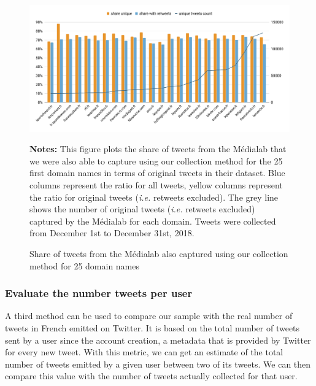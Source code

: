 \begin{figure}
\begin{center}
\includegraphics[width=1\textwidth]{figures/ShareInCommonWithMedialab.pdf}
\end{center}
\scriptsize \textbf{Notes:} This figure plots the share of tweets from the Médialab that we were also able to capture using our collection method for the 25 first domain names in terms of original tweets in their dataset. Blue columns represent the ratio for all tweets, yellow columns represent the ratio for original tweets (\textit{i.e.} retweets excluded). The grey line shows the number of original tweets (\textit{i.e.} retweets excluded) captured by the Médialab for each domain. Tweets were collected from December 1st to December 31st, 2018.

\caption{Share of tweets from the Médialab also captured using our collection method for 25 domain names}
\label{Figure:HistogramUrlsMedialab}
\end{figure}

\subsubsection{Evaluate the number tweets per user}

A third method can be used to compare our sample with the real number of tweets in French emitted on Twitter. It is based on the total number of tweets sent by a user since the account creation, a metadata that is provided by Twitter for every new tweet. With this metric, we can get an estimate of the total number of tweets emitted by a given user between two of its tweets. We can then compare this value with the number of tweets actually collected for that user.

